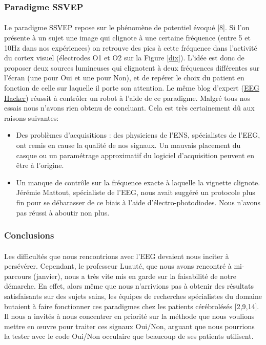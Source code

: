 \documentclass[11pt,a4paper]{article}
\theoremstyle{plain}
\theoremstyle{definition}
\begin{document}
\subsubsection{Paradigme SSVEP}

\paragraph{} Le paradigme SSVEP repose sur le phénomène de potentiel évoqué [8]. Si l'on présente à un sujet une image qui clignote à une certaine fréquence (entre 5 et 10Hz dans nos expériences) on retrouve 
des pics à cette fréquence dans l'activité du cortex visuel (électrodes O1 et O2 sur la Figure \ref{dix}). L'idée est donc de proposer deux sources lumineuses qui clignotent à deux fréquences différentes sur l'écran (une pour Oui et une pour Non), et de repérer le choix du patient en fonction de celle sur laquelle il porte son attention. Le même blog d'expert (\href{http://eeghacker.blogspot.com/}{EEG Hacker}) réussit à contrôler un robot à l'aide de ce paradigme.
Malgré tous nos essais nous n'avons rien obtenu de concluant. Cela est très certainement dû aux raisons suivantes:

\begin{itemize}
\item Des problèmes d'acquisitions : des physiciens de l'ENS, spécialistes de l'EEG, ont remis en cause la qualité de nos signaux. Un mauvais placement du casque ou un paramétrage approximatif du logiciel d'acquisition peuvent en être à l'origine.
\item Un manque de contrôle sur la fréquence exacte à laquelle la vignette clignote. Jérémie Mattout, spécialiste de l'EEG, nous avait suggéré un protocole
plus fin pour se débarasser de ce biais à l'aide d'électro-photodiodes. Nous n'avons pas réussi à aboutir non plus.
\end{itemize}

\subsubsection{Conclusions}

\paragraph{} Les difficultés que nous rencontrions avec l'EEG devaient nous inciter à persévérer. Cependant, le professeur Luauté, que nous avons rencontré à mi-parcours (janvier), nous a très vite mis en garde sur la faisabilité de notre démarche. En effet, alors même que nous n'arrivions pas à obtenir des résultats satisfaisants sur des sujets sains, les équipes de recherches spécialistes du domaine butaient à faire fonctionner ces paradigmes chez les patients cérébrolésés [2,9,14]. Il nous a invités à nous concentrer en priorité sur la méthode que nous voulions mettre en \oe uvre pour traiter ces signaux Oui/Non, arguant que nous pourrions la tester avec le code Oui/Non occulaire que beaucoup de ses patients utilisent. 
\end{document}
